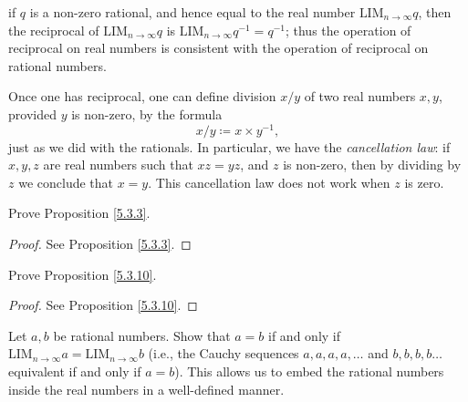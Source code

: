\begin{note}
    if \(q\) is a non-zero rational, and hence equal to the real number \(\text{LIM}_{n \to \infty} q\), then the reciprocal of \(\text{LIM}_{n \to \infty} q\) is \(\text{LIM}_{n \to \infty} q^{-1} = q^{-1}\);
    thus the operation of reciprocal on real numbers is consistent with the operation of reciprocal on rational numbers.
\end{note}

\begin{note}
    Once one has reciprocal, one can define division \(x / y\) of two real numbers \(x, y\), provided \(y\) is non-zero, by the formula
    \[
        x / y \coloneqq x \times y^{-1},
    \]
    just as we did with the rationals.
    In particular, we have the \emph{cancellation law}:
    if \(x, y, z\) are real numbers such that \(xz = yz\), and \(z\) is non-zero, then by dividing by \(z\) we conclude that \(x = y\).
    This cancellation law does not work when \(z\) is zero.
\end{note}

\exercisesection

\begin{exercise}\label{ex 5.3.1}
    Prove Proposition \ref{5.3.3}.
\end{exercise}

\begin{proof}
    See Proposition \ref{5.3.3}.
\end{proof}

\begin{exercise}\label{ex 5.3.2}
    Prove Proposition \ref{5.3.10}.
\end{exercise}

\begin{proof}
    See Proposition \ref{5.3.10}.
\end{proof}

\begin{exercise}\label{ex 5.3.3}
    Let \(a, b\) be rational numbers.
    Show that \(a = b\) if and only if \(\text{LIM}_{n \to \infty} a = \text{LIM}_{n \to \infty} b\) (i.e., the Cauchy sequences \(a, a, a, a, \dots\) and \(b, b, b, b \dots\) equivalent if and only if \(a = b\)).
    This allows us to embed the rational numbers inside the real numbers in a well-defined manner.
\end{exercise}

